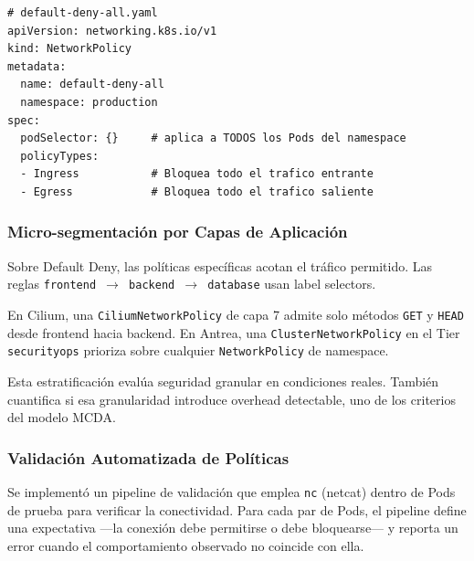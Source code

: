 \begin{lstlisting}
# default-deny-all.yaml
apiVersion: networking.k8s.io/v1
kind: NetworkPolicy
metadata:
  name: default-deny-all
  namespace: production
spec:
  podSelector: {}     # aplica a TODOS los Pods del namespace
  policyTypes:
  - Ingress           # Bloquea todo el trafico entrante
  - Egress            # Bloquea todo el trafico saliente
\end{lstlisting}

\subsubsection{Micro-segmentación por Capas de Aplicación}

Sobre Default Deny, las políticas específicas acotan el tráfico permitido. Las reglas \texttt{frontend $\rightarrow$ backend $\rightarrow$ database} usan label selectors.

En Cilium, una \texttt{CiliumNetworkPolicy} de capa 7 admite solo métodos \texttt{GET} y \texttt{HEAD} desde frontend hacia backend. En Antrea, una \texttt{ClusterNetworkPolicy} en el Tier \texttt{securityops} prioriza sobre cualquier \texttt{NetworkPolicy} de namespace.

Esta estratificación evalúa seguridad granular en condiciones reales. También cuantifica si esa granularidad introduce overhead detectable, uno de los criterios del modelo MCDA.

\subsubsection{Validación Automatizada de Políticas}

Se implementó un pipeline de validación que emplea \texttt{nc} (netcat) dentro de Pods de prueba para verificar la conectividad. Para cada par de Pods, el pipeline define una expectativa ---la conexión debe permitirse o debe bloquearse--- y reporta un error cuando el comportamiento observado no coincide con ella.

